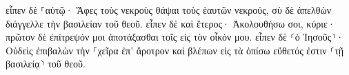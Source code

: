 \documentclass{openreader}
\begin{document}
εἶπεν δὲ ⸀αὐτῷ· Ἄφες τοὺς νεκροὺς θάψαι τοὺς ἑαυτῶν νεκρούς, σὺ δὲ ἀπελθὼν διάγγελλε τὴν βασιλείαν τοῦ θεοῦ. 
εἶπεν δὲ καὶ ἕτερος· Ἀκολουθήσω σοι, κύριε· πρῶτον δὲ ἐπίτρεψόν μοι ἀποτάξασθαι τοῖς εἰς τὸν οἶκόν μου. 
εἶπεν δὲ ⸂ὁ Ἰησοῦς⸃· Οὐδεὶς ἐπιβαλὼν τὴν ⸀χεῖρα ἐπ’ ἄροτρον καὶ βλέπων εἰς τὰ ὀπίσω εὔθετός ἐστιν ⸂τῇ βασιλείᾳ⸃ τοῦ θεοῦ. 
\end{document}
